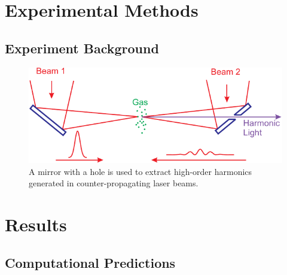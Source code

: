 \documentclass[oneside, astronomy, noacknowlegments]{BYUPhys}
\begin{document}
\section{}
\section{}

\chapter{Experimental Methods}
\section{}
\section{}
\section{Experiment Background}

\begin{figure}
    \centerline{\includegraphics{Graphic1}}
    \caption[SiC energy levels and zero-field splitting]{\label{fig:SiCZeeman}
     A mirror with a hole is used to extract high-order harmonics generated in
     counter-propagating laser beams.}
 \end{figure}

\section{}

\chapter{Results}
\section{Computational Predictions}
\end{document}
